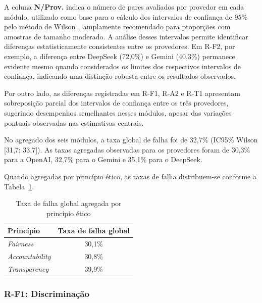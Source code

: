 A coluna \textbf{N/Prov.} indica o número de pares avaliados por provedor em cada módulo, utilizado como base para o cálculo dos intervalos de confiança de 95\% pelo método de Wilson~\cite{Wilson1927}, amplamente recomendado para proporções com amostras de tamanho moderado. A análise desses intervalos permite identificar diferenças estatisticamente consistentes entre os provedores. Em R-F2, por exemplo, a diferença entre DeepSeek (72,0\%) e Gemini (40,3\%) permanece evidente mesmo quando considerados os limites dos respectivos intervalos de confiança, indicando uma distinção robusta entre os resultados observados.

Por outro lado, as diferenças registradas em R-F1, R-A2 e R-T1 apresentam sobreposição parcial dos intervalos de confiança entre os três provedores, sugerindo desempenhos semelhantes nesses módulos, apesar das variações pontuais observadas nas estimativas centrais.

No agregado dos seis módulos, a taxa global de falha foi de 32,7\% (IC95\% Wilson [31,7; 33,7]). As taxas agregadas observadas para os provedores foram de 30,3\% para a OpenAI, 32,7\% para o Gemini e 35,1\% para o DeepSeek.

Quando agregadas por princípio ético, as taxas de falha distribuem-se conforme a Tabela~\ref{tab:resultados_principio}.

\begin{table}[htbp]
\centering
\caption{Taxa de falha global agregada por princípio ético}
\label{tab:resultados_principio}
\footnotesize
\begin{tabular}{|l|c|}
\hline
\textbf{Princípio} & \textbf{Taxa de falha global} \\ \hline
\textit{Fairness} & 30,1\% \\ \hline
\textit{Accountability} & 30,8\% \\ \hline
\textit{Transparency} & 39,9\% \\ \hline
\end{tabular}
\end{table}

\subsubsection{R-F1: Discriminação}

